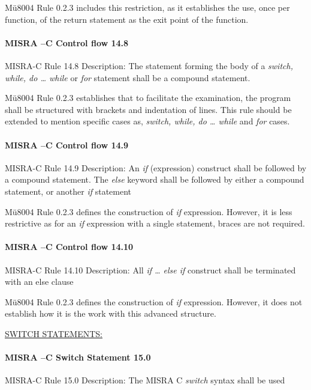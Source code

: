Mü8004 Rule 0.2.3 includes this restriction, as it establishes the use, once per function, of the return statement as the exit point of the function. 

\paragraph{MISRA –C Control flow 14.8}
MISRA-C Rule 14.8 Description: The statement forming the body of a \textit{switch, while, do … while} or \textit{for} statement shall be a compound statement.

Mü8004 Rule 0.2.3 establishes that to facilitate the examination, the program shall be structured with brackets and indentation of lines. This rule should be extended to mention specific cases as, \textit{switch, while, do … while} and \textit{for} cases.

\paragraph{MISRA –C Control flow 14.9}
MISRA-C Rule 14.9 Description: An \textit{if} (expression) construct shall be followed by a compound statement. The \textit{else} keyword shall be followed by either a compound statement, or another \textit{if} statement

Mü8004 Rule 0.2.3 defines the construction of \textit{if} expression. However, it is less restrictive as for an \textit{if} expression with a single statement, braces are not required.

\paragraph{MISRA –C Control flow 14.10}
MISRA-C Rule 14.10 Description: All \textit{if … else if} construct shall be terminated with an else clause

Mü8004 Rule 0.2.3 defines the construction of \textit{if} expression. However, it does not establish how it is the work with this advanced structure. 


\begin{center}
\textsc{\underline{SWITCH STATEMENTS:}}
\end{center}

\paragraph{MISRA –C Switch Statement 15.0}
MISRA-C Rule 15.0 Description: The MISRA C \textit{switch} syntax shall be used

